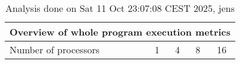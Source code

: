 \begin{table}[h]
\begin{center}
\begin{tabular}{|l|c|c|c|c|}
\hline
\multicolumn{5}{|c|}{Overview of whole program execution metrics} \\
\hline
\hline
Number of processors & 1 & 4 & 8 & 16 \\
\hline
\end{tabular}
\end{center}
\caption{ Analysis done on Sat 11 Oct 23:07:08 CEST 2025, jens}
\end{table}
